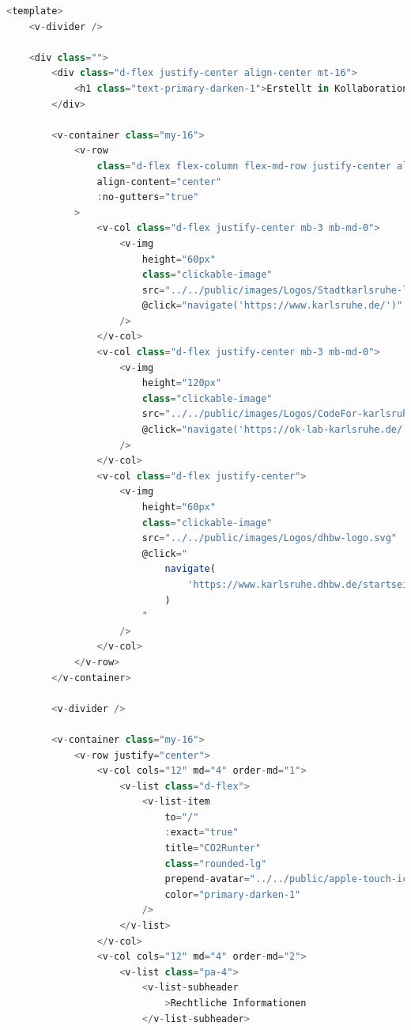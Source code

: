\begin{lstlisting}[language={JavaScript}, caption={Footer Definition}]
    <template>
    <v-divider />

    <div class="">
        <div class="d-flex justify-center align-center mt-16">
            <h1 class="text-primary-darken-1">Erstellt in Kollaboration</h1>
        </div>

        <v-container class="my-16">
            <v-row
                class="d-flex flex-column flex-md-row justify-center align-center"
                align-content="center"
                :no-gutters="true"
            >
                <v-col class="d-flex justify-center mb-3 mb-md-0">
                    <v-img
                        height="60px"
                        class="clickable-image"
                        src="../../public/images/Logos/Stadtkarlsruhe-logo.svg"
                        @click="navigate('https://www.karlsruhe.de/')"
                    />
                </v-col>
                <v-col class="d-flex justify-center mb-3 mb-md-0">
                    <v-img
                        height="120px"
                        class="clickable-image"
                        src="../../public/images/Logos/CodeFor-karlsruhe.svg"
                        @click="navigate('https://ok-lab-karlsruhe.de/')"
                    />
                </v-col>
                <v-col class="d-flex justify-center">
                    <v-img
                        height="60px"
                        class="clickable-image"
                        src="../../public/images/Logos/dhbw-logo.svg"
                        @click="
                            navigate(
                                'https://www.karlsruhe.dhbw.de/startseite.html'
                            )
                        "
                    />
                </v-col>
            </v-row>
        </v-container>

        <v-divider />

        <v-container class="my-16">
            <v-row justify="center">
                <v-col cols="12" md="4" order-md="1">
                    <v-list class="d-flex">
                        <v-list-item
                            to="/"
                            :exact="true"
                            title="CO2Runter"
                            class="rounded-lg"
                            prepend-avatar="../../public/apple-touch-icon.png"
                            color="primary-darken-1"
                        />
                    </v-list>
                </v-col>
                <v-col cols="12" md="4" order-md="2">
                    <v-list class="pa-4">
                        <v-list-subheader
                            >Rechtliche Informationen
                        </v-list-subheader>


\end{lstlisting}
